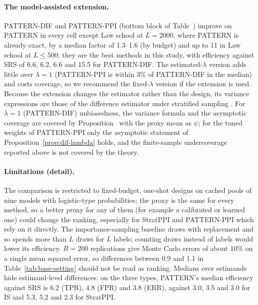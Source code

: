 \paragraph{The model-assisted extension.} PATTERN-DIF and PATTERN-PPI (bottom block of Table~) improve on PATTERN in every cell except Law school at $L=2000$, where PATTERN is already exact, by a median factor of 1.3--1.6 (by budget) and up to 11 in Law school at $L\le500$; they are the best methods in this study, with efficiency against SRS of 6.6, 6.2, 6.6 and 15.5 for PATTERN-DIF. The estimated-$\lambda$ version adds little over $\lambda=1$ (PATTERN-PPI is within 3\% of PATTERN-DIF in the median) and costs coverage, so we recommend the fixed-$\lambda$ version if the extension is used. Because the extension changes the estimator rather than the design, its variance expressions are those of the difference estimator under stratified sampling \citep{sarndal1992}. For $\lambda=1$ (PATTERN-DIF) unbiasedness, the variance formula and the asymptotic coverage are covered by Proposition~ with the proxy mean as $\psi$; for the tuned weights of PATTERN-PPI only the asymptotic statement of Proposition~\ref{prop:dif-lambda} holds, and the finite-sample undercoverage reported above is not covered by the theory.

\paragraph{Limitations (detail).} The comparison is restricted to fixed-budget, one-shot designs on cached pools of nine models with logistic-type probabilities; the proxy is the same for every method, so a better proxy for any of them (for example a calibrated or learned one) could change the ranking, especially for StratPPI and PATTERN-PPI which rely on it directly. The importance-sampling baseline draws with replacement and so spends more than $L$ draws for $L$ labels; counting draws instead of labels would lower its efficiency. $R=200$ replications give Monte Carlo errors of about 10\% on a single mean squared error, so differences between 0.9 and 1.1 in Table~\ref{tab:base-setting} should not be read as ranking. Medians over estimands hide estimand-level differences: on the three types, PATTERN's median efficiency against SRS is 6.2 (TPR), 4.8 (FPR) and 3.8 (ERR), against 3.0, 3.5 and 3.0 for IS and 5.3, 5.2 and 2.3 for StratPPI.
